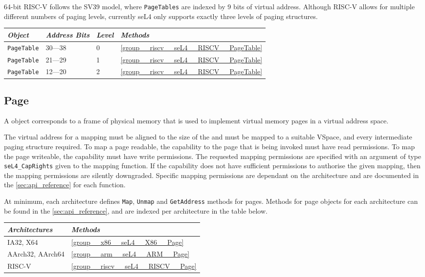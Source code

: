 64-bit RISC-V follows the SV39 model, where \texttt{PageTables} are indexed by 9 bits of virtual address.
Although RISC-V allows
for multiple different numbers of paging levels, currently seL4 only supports exactly three levels
of paging structures.

\begin{tabularx}{\textwidth}{Xlll} \toprule
\emph{Object}          & \emph{Address Bits} & \emph{Level} & \emph{Methods} \\ \midrule
\texttt{PageTable}     & 30---38             & 0            & \autoref{group__riscv__seL4__RISCV__PageTable} \\
\texttt{PageTable}     & 21---29             & 1            & \autoref{group__riscv__seL4__RISCV__PageTable} \\
\texttt{PageTable}     & 12---20             & 2            & \autoref{group__riscv__seL4__RISCV__PageTable} \\
\bottomrule
\end{tabularx}

\subsection{Page}

A  object corresponds to a frame of physical memory that is used to
implement virtual memory pages in a virtual address space.

The virtual address for a  mapping
must be aligned to
the size of the  and must be mapped to a suitable VSpace, and every intermediate paging
structure required.
To map a page readable, the capability
to the page
that is being invoked must have read permissions. To map the page
writeable, the capability must have write permissions. The requested
mapping permissions are specified with an argument of type
\texttt{seL4\_CapRights} given to the mapping function.
If the capability does not have
sufficient permissions to authorise the given mapping, then
the mapping permissions are silently downgraded. Specific mapping permissions are dependant on the
architecture and are documented in the \autoref{sec:api_reference} for each function.

At minimum, each architecture defines \texttt{Map}, \texttt{Unmap} and
\texttt{GetAddress} methods for pages.
Methods for page objects for each architecture can be found in the \autoref{sec:api_reference}, and
are indexed per architecture in the table below.

\begin{tabularx}{\textwidth}{Xl} \toprule
\emph{Architectures} & \emph{Methods} \\ \midrule
IA32, X64            & \autoref{group__x86__seL4__X86__Page} \\
AArch32, AArch64     & \autoref{group__arm__seL4__ARM__Page} \\
    RISC-V           & \autoref{group__riscv__seL4__RISCV__Page} \\
\bottomrule
\end{tabularx}

